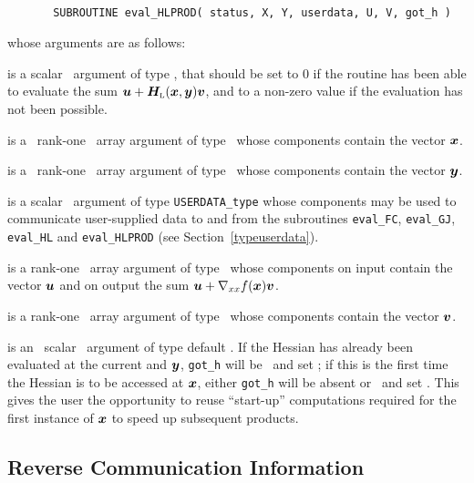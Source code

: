 \documentclass{galahad}
\newcommand{\bmHL}{\bmH\sub{L}}
\begin{document}
\def\baselinestretch{0.8}
{\tt
\begin{verbatim}
       SUBROUTINE eval_HLPROD( status, X, Y, userdata, U, V, got_h )
\end{verbatim} }
\def\baselinestretch{1.0}
\noindent whose arguments are as follows:

\begin{description}
 is a scalar \intentout\ argument of type \integer,
that should be set to 0 if the routine has been able to evaluate the
sum $\bmu + \bmHL(\bmx,\bmy) \bmv$,
and to a non-zero value if the evaluation has not been possible.

 is a \ rank-one \intentin\ array argument of type
\realdp\ whose components contain the vector ${\bm{x}}$.

 is a \ rank-one \intentin\ array argument of type
\realdp\ whose components contain the vector ${\bm{y}}$.

 is a scalar \intentinout\ argument of type
{\tt USERDATA\_type} whose components may be used
to communicate user-supplied data to and from the
subroutines {\tt eval\_FC}, {\tt eval\_GJ},
{\tt eval\_HL} and {\tt eval\_HLPROD}
(see Section~\ref{typeuserdata}).

 is a rank-one \intentinout\ array argument of type \realdp\
whose components on input contain the vector ${\bm{u}}$ and on output the
sum ${\bm{u}} + \nabla_{xx} f({\bm{x}}) {\bm{v}}$.

 is a rank-one \intentin\ array argument of type \realdp\
whose components contain the vector ${\bm{v}}$.

 is an \optional\ scalar \intentin\ argument of type default
\logical. If the Hessian has already been evaluated at the current 
and ${\bm{y}}$, {\tt got\_h} will be \present\ and set \true; if this is the 
first time the Hessian is to be accessed at ${\bm{x}}$, either {\tt got\_h} 
will be absent
or \present\ and set \false. This gives the user the opportunity
to reuse ``start-up'' computations required for the first instance of
${\bm{x}}$ to speed up subsequent products.

\end{description}



\subsection{\label{reverse}Reverse Communication Information}
\end{document}
